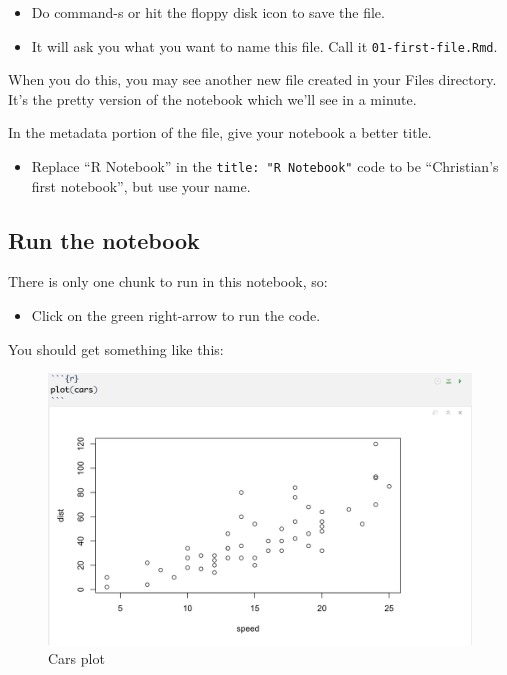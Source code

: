 \documentclass[]{book}
\providecommand{\tightlist}{%
  \setlength{\itemsep}{0pt}\setlength{\parskip}{0pt}}
\begin{document}
\begin{itemize}
\tightlist
\item
  Do command-s or hit the floppy disk icon to save the file.
\item
  It will ask you what you want to name this file. Call it
  \texttt{01-first-file.Rmd}.
\end{itemize}

When you do this, you may see another new file created in your Files
directory. It's the pretty version of the notebook which we'll see in a
minute.

In the metadata portion of the file, give your notebook a better title.

\begin{itemize}
\tightlist
\item
  Replace ``R Notebook'' in the \texttt{title:\ "R\ Notebook"} code to
  be ``Christian's first notebook'', but use your name.
\end{itemize}

\subsection{Run the notebook}\label{run-the-notebook}

There is only one chunk to run in this notebook, so:

\begin{itemize}
\tightlist
\item
  Click on the green right-arrow to run the code.
\end{itemize}

You should get something like this:

\begin{figure}
\centering
\includegraphics[width=6.25000in]{_images/02-rstudio-defaultplot.png}
\caption{Cars plot}
\end{figure}
\end{document}
